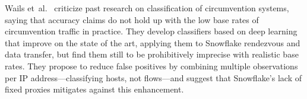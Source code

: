 \documentclass[letterpaper,twocolumn]{article}
\begin{document}
Wails et~al.~\cite{Wails2024a}
criticize past research on classification of circumvention systems,
saying that accuracy claims do not hold up
with the low base rates of circumvention traffic in practice.
They develop classifiers based on deep learning
that improve on the state of the art,
applying them to Snowflake rendezvous and data transfer,
but find them still to be prohibitively imprecise with realistic base rates.
They propose to reduce false positives by combining
multiple observations per IP address---classifying hosts,
not flows---and suggest that Snowflake's lack of
fixed proxies mitigates against this enhancement.
\end{document}
